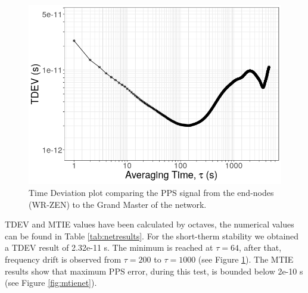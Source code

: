 \begin{figure}
	\centering
	\includegraphics[width=0.7\linewidth]{img/tdev_exp3}
	\caption[TDEV of the end-nodes in the scalability test.]{Time Deviation 
	plot comparing the PPS signal from the end-nodes (WR-ZEN) to the Grand 
	Master of the network.}
	\label{fig:tdevnet}
\end{figure}

TDEV and MTIE values have been calculated by octaves, the numerical 
values can be found in Table \ref{tab:netresults}. For the short-therm 
stability we obtained a TDEV result of 2.32e-11 s. The minimum is reached at 
$\tau=64$, after that, frequency drift is observed from $\tau=200$ to 
$\tau=1000$ (see Figure \ref{fig:tdevnet}). The MTIE results show that maximum 
PPS error, during this test, is bounded below 2e-10 s (see Figure 
\ref{fig:mtienet}).

